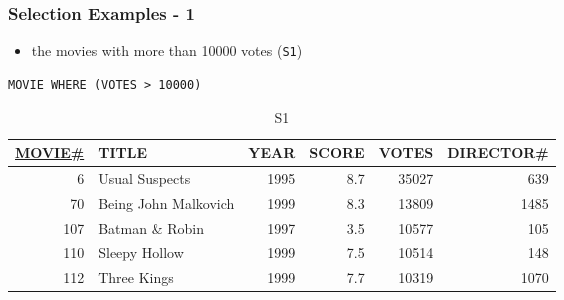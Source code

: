 \documentclass[dvipsnames]{beamer}
\theoremstyle{plain}
\begin{document}
\begin{frame}[fragile]
  \frametitle{Selection Examples - 1}

  \begin{example}
    \begin{itemize}
      \item the movies with more than 10000 votes (\texttt{S1})
    \end{itemize}

    \begin{lstlisting}
MOVIE WHERE (VOTES > 10000)
    \end{lstlisting}

    \pause
    \vspace{-10pt}
    \begin{tiny}
    \begin{table}
      \caption{S1}
      \begin{tabular}{|r|l|r|r|r|r|}\hline
\underline{MOVIE\#} & TITLE & YEAR & SCORE & VOTES & DIRECTOR\#\\[2pt]\hline\hline
  6 & Usual Suspects        & 1995 &   8.7 & 35027 &        639\\\hline
 70 & Being John Malkovich  & 1999 &   8.3 & 13809 &       1485\\\hline
107 & Batman \& Robin       & 1997 &   3.5 & 10577 &        105\\\hline
110 & Sleepy Hollow         & 1999 &   7.5 & 10514 &        148\\\hline
112 & Three Kings           & 1999 &   7.7 & 10319 &       1070\\\hline
      \end{tabular}
    \end{table}
    \end{tiny}
  \end{example}
\end{frame}
\end{document}
